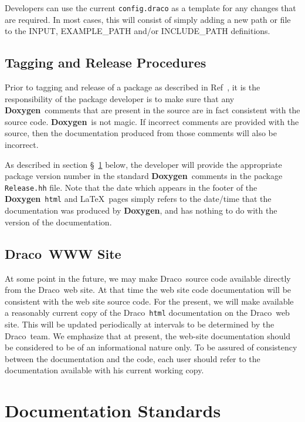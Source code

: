 \documentclass[11pt]{nmemo}
\newcommand{\draco}{{\normalfont\sffamily Draco}}
\newcommand{\doxy}{{\normalfont\bfseries Doxygen}}
\begin{document}
Developers can use the current \texttt{config.draco} as a template for
any changes that are required. In most cases, this will consist of
simply adding a new path or file to the INPUT, EXAMPLE\_PATH and/or 
INCLUDE\_PATH definitions.


\subsection{Tagging and Release Procedures}
\label{sec:reltag}
Prior to tagging and release of a package as described in Ref~\cite{xtm:9936},
 it is 
the responsibility of the package developer is to make sure that any \doxy\
comments that are present in the source are in fact consistent with the
source code. \doxy\ is not magic. If incorrect comments are provided with
the source, then the documentation produced from those comments will also
be incorrect.

As described in section \S~\ref{sec:std} below, 
the developer will provide 
the appropriate package version number in the standard \doxy\ comments in the 
package \texttt{Release.hh} file.
Note that the date which appears in the footer of the \doxy\ 
\texttt{html} and \LaTeX\ pages
simply refers to the date/time that the documentation was produced by \doxy, 
and has nothing to do with the version of the documentation.

\subsection{\draco\ WWW Site}
\label{sec:www}

At some point in the future, we may make \draco\ source code available
directly from the \draco\ web site. At that time the web site code
documentation will be consistent with the web site source code.
For the present, 
we will make available a reasonably current copy of the \draco\ \texttt{html}
documentation on the \draco\ web site. This will be updated periodically
at intervals to be determined by the \draco\ team. 
We emphasize that at present, the web-site documentation should be 
considered to be of an informational nature only. To be assured of
consistency between the documentation and the code, each
user should refer to the documentation available with 
his current working copy.



\section{Documentation Standards}
\label{sec:std}
\end{document}
